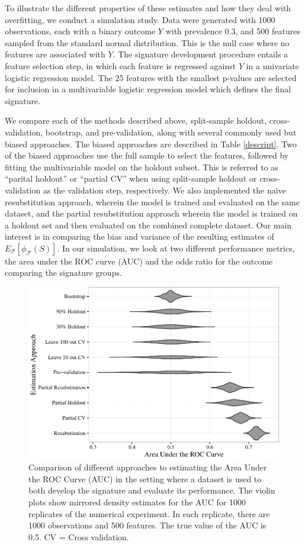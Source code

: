 \documentclass[12pt,]{article}
\begin{document}
To illustrate the different properties of these estimates and how they
deal with overfitting, we conduct a simulation study. Data were
generated with 1000 observations, each with a binary outcome \(Y\) with
prevalence 0.3, and 500 features sampled from the standard normal
distribution. This is the null case where no features are associated
with \(Y\). The signature development procedure entails a feature
selection step, in which each feature is regressed against \(Y\) in a
univariate logistic regression model. The 25 features with the smallest
p-values are selected for inclusion in a multivariable logistic
regression model which defines the final signature.

We compare each of the methods described above, split-sample holdout,
cross-validation, bootstrap, and pre-validation, along with several
commonly used but biased approaches. The biased approaches are described
in Table \ref{descript}. Two of the biased approaches use the full
sample to select the features, followed by fitting the multivariable
model on the holdout subset. This is referred to as ``parital holdout''
or ``partial CV'' when using split-sample holdout or cross-validation as
the validation step, respectively. We also implemented the naive
resubstitution approach, wherein the model is trained and evaluated on
the same dataset, and the partial resubstitution approach wherein the
model is trained on a holdout set and then evaluated on the combined
complete dataset. Our main interest is in comparing the bias and
variance of the resulting estimates of
\(E_{\mathcal{P}}[\phi_{\mathcal{F}}(S)]\). In our simulation, we look
at two different performance metrics, the area under the ROC curve (AUC)
and the odds ratio for the outcome comparing the signature groups.

\begin{figure}[htbp]
\centering
\includegraphics{paper_files/figure-latex/cvsims-1.pdf}
\caption{Comparison of different approaches to estimating the Area Under
the ROC Curve (AUC) in the setting where a dataset is used to both
develop the signature and evaluate its performance. The violin plots
show mirrored density estimates for the AUC for 1000 replicates of the
numerical experiment. In each replicate, there are 1000 observations and
500 features. The true value of the AUC is 0.5. CV = Cross validation.
\label{fig1}}
\end{figure}
\end{document}
